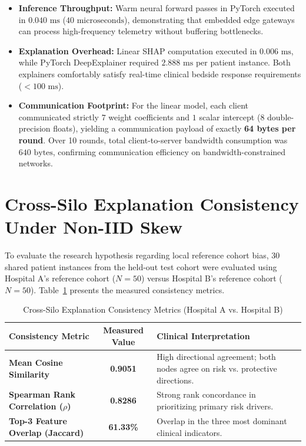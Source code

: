 \documentclass[12pt,a4paper,oneside]{report}
\begin{document}
\begin{itemize}
    \item \textbf{Inference Throughput:} Warm neural forward passes in PyTorch executed in $0.040\text{ ms}$ ($40\text{ microseconds}$), demonstrating that embedded edge gateways can process high-frequency telemetry without buffering bottlenecks.
    \item \textbf{Explanation Overhead:} Linear SHAP computation executed in $0.006\text{ ms}$, while PyTorch DeepExplainer required $2.888\text{ ms}$ per patient instance. Both explainers comfortably satisfy real-time clinical bedside response requirements ($< 100\text{ ms}$).
    \item \textbf{Communication Footprint:} For the linear model, each client communicated strictly $7$ weight coefficients and $1$ scalar intercept ($8$ double-precision floats), yielding a communication payload of exactly \textbf{64 bytes per round}. Over 10 rounds, total client-to-server bandwidth consumption was $640\text{ bytes}$, confirming communication efficiency on bandwidth-constrained networks.
\end{itemize}

\section{Cross-Silo Explanation Consistency Under Non-IID Skew}
To evaluate the research hypothesis regarding local reference cohort bias, 30 shared patient instances from the held-out test cohort were evaluated using Hospital A's reference cohort ($N=50$) versus Hospital B's reference cohort ($N=50$). Table~\ref{tab:consistency_metrics} presents the measured consistency metrics.

\begin{table}[H]
\centering
\caption{Cross-Silo Explanation Consistency Metrics (Hospital A vs. Hospital B)}
\label{tab:consistency_metrics}
\begin{tabularx}{\textwidth}{p{6.0cm} c X}
\toprule
\textbf{Consistency Metric} & \textbf{Measured Value} & \textbf{Clinical Interpretation} \\
\midrule
\textbf{Mean Cosine Similarity} & \textbf{0.9051} & High directional agreement; both nodes agree on risk vs. protective directions. \\
\textbf{Spearman Rank Correlation ($\rho$)} & \textbf{0.8286} & Strong rank concordance in prioritizing primary risk drivers. \\
\textbf{Top-3 Feature Overlap (Jaccard)} & \textbf{61.33\%} & Overlap in the three most dominant clinical indicators. \\
\bottomrule
\end{tabularx}
\end{table}
\end{document}

